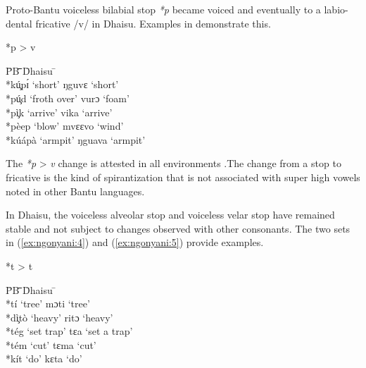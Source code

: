 \documentclass[output=paper,colorlinks,citecolor=brown]{langscibook}
\begin{document}
Proto-Bantu voiceless bilabial stop \textit{*p} became voiced and eventually to a labio-dental fricative /v/ in Dhaisu. Examples in  demonstrate this.

\ea%
	\label{ex:ngonyani:3}
	*p > v\\
    \begin{tabbing} 
        \= PB \quad\= \quad\= \quad\= \quad\= \quad\= \quad\= \quad\= \quad\= Dhaisu \quad\=  \quad\= \\
        \> *kú̧pɪ́ \> \>‘short’ \> \> \>  \> \> \> ŋguvɛ \> `short' \\
        \> *pú̧d \> \>‘froth over’ \>  \> \> \> \> \> vurɔ \> ‘foam’\\
        \> *pì̧k \> \>‘arrive’ \> \>  \> \> \> \> vika \> ‘arrive’\\
        \> *pèep \> \>‘blow’ \> \> \> \> \> \> mvɛɛvo \> ‘wind’\\
        \> *kúápà \> \>‘armpit’ \> \> \>  \> \> \> ŋguava \> ‘armpit’
    \end{tabbing}
\z

The  \textit{*p} > \textit{v}  change is attested in all environments .The change from a stop to fricative is the kind of spirantization that is not associated with super high vowels noted in other Bantu languages.

In Dhaisu, the voiceless alveolar stop and voiceless velar stop have remained stable and not subject to changes observed with other consonants. The two sets in (\ref{ex:ngonyani:4}) and (\ref{ex:ngonyani:5}) provide examples.

\ea%
    \label{ex:ngonyani:4}
    *t > t\\
    \begin{tabbing} 
        \= PB \quad\= \quad\= \quad\= \quad\= \quad\= \quad\= \quad\= Dhaisu \quad\=  \quad\= \\
        \>  *tí\>  ‘tree’ \> \> \>  \> \> \>  mɔti \>  ‘tree’\\
        \> *dì̧tò\> ‘heavy’ \> \> \>  \> \> \>  ritɔ \>  ‘heavy’\\
        \>  *tég \> ‘set trap’ \> \> \>  \> \> \>  tɛa \>  ‘set a trap’\\
        \>  *tém \>  ‘cut’ \> \> \>  \> \> \>  tɛma \>  ‘cut’ \\
        \> *kít \> ‘do’ \> \> \>  \> \> \> kɛta \> ‘do’    
    \end{tabbing}
\z
\end{document}
